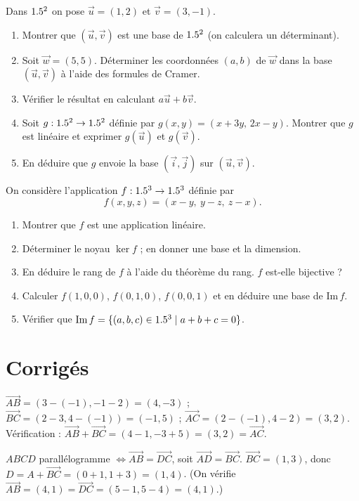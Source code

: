 Dans $1.5^2$ on pose $\vec u=(1,2)$ et $\vec v=(3,-1)$.
\begin{enumerate}[label=\arabic*)]
\item Montrer que $(\vec u,\vec v)$ est une base de $1.5^2$ (on calculera un déterminant).
\item Soit $\vec w=(5,5)$. Déterminer les coordonnées $(a,b)$ de $\vec w$ dans la base
$(\vec u,\vec v)$ à l'aide des formules de Cramer.
\item Vérifier le résultat en calculant $a\vec u+b\vec v$.
\item Soit $g:1.5^2\to1.5^2$ définie par $g(x,y)=(x+3y,\,2x-y)$. Montrer que $g$ est linéaire et
exprimer $g(\vec u)$ et $g(\vec v)$.
\item En déduire que $g$ envoie la base $(\vec i,\vec j)$ sur $(\vec u,\vec v)$.
\end{enumerate}

On considère l'application $f:1.5^3\to1.5^3$ définie par
\[
f(x,y,z)=(x-y,\ y-z,\ z-x).
\]
\begin{enumerate}[label=\arabic*)]
\item Montrer que $f$ est une application linéaire.
\item Déterminer le noyau $\ker f$ ; en donner une base et la dimension.
\item En déduire le rang de $f$ à l'aide du théorème du rang. $f$ est-elle bijective ?
\item Calculer $f(1,0,0)$, $f(0,1,0)$, $f(0,0,1)$ et en déduire une base de $\mathrm{Im}\,f$.
\item Vérifier que $\mathrm{Im}\,f=\{(a,b,c)\in1.5^3\mid a+b+c=0\}$.
\end{enumerate}

\section{Corrigés}

$\vec{AB}=(3-(-1),-1-2)=(4,-3)$ ; $\vec{BC}=(2-3,4-(-1))=(-1,5)$ ;
$\vec{AC}=(2-(-1),4-2)=(3,2)$. Vérification : $\vec{AB}+\vec{BC}=(4-1,-3+5)=(3,2)=\vec{AC}$. \checkmark

$ABCD$ parallélogramme $\Leftrightarrow\vec{AB}=\vec{DC}$, soit $\vec{AD}=\vec{BC}$.
$\vec{BC}=(1,3)$, donc $D=A+\vec{BC}=(0+1,1+3)=(1,4)$. (On vérifie $\vec{AB}=(4,1)=\vec{DC}=(5-1,5-4)=(4,1)$.)

